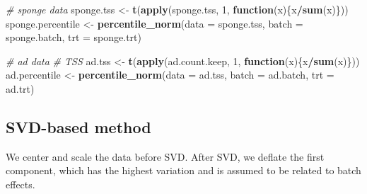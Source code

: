 \documentclass[]{book}
\newenvironment{Shaded}{\begin{snugshade}}{\end{snugshade}}
\newcommand{\KeywordTok}[1]{\textcolor[rgb]{0.13,0.29,0.53}{\textbf{#1}}}
\newcommand{\DataTypeTok}[1]{\textcolor[rgb]{0.13,0.29,0.53}{#1}}
\newcommand{\DecValTok}[1]{\textcolor[rgb]{0.00,0.00,0.81}{#1}}
\newcommand{\StringTok}[1]{\textcolor[rgb]{0.31,0.60,0.02}{#1}}
\newcommand{\CommentTok}[1]{\textcolor[rgb]{0.56,0.35,0.01}{\textit{#1}}}
\newcommand{\ControlFlowTok}[1]{\textcolor[rgb]{0.13,0.29,0.53}{\textbf{#1}}}
\newcommand{\OperatorTok}[1]{\textcolor[rgb]{0.81,0.36,0.00}{\textbf{#1}}}
\newcommand{\NormalTok}[1]{#1}
\begin{document}
\begin{Shaded}
\begin{Highlighting}[]
\CommentTok{# sponge data}
\NormalTok{sponge.tss <-}\StringTok{ }\KeywordTok{t}\NormalTok{(}\KeywordTok{apply}\NormalTok{(sponge.tss, }\DecValTok{1}\NormalTok{, }\ControlFlowTok{function}\NormalTok{(x)\{x}\OperatorTok{/}\KeywordTok{sum}\NormalTok{(x)\}))}
\NormalTok{sponge.percentile <-}\StringTok{ }\KeywordTok{percentile_norm}\NormalTok{(}\DataTypeTok{data =}\NormalTok{ sponge.tss, }\DataTypeTok{batch =}\NormalTok{ sponge.batch, }
                                    \DataTypeTok{trt =}\NormalTok{ sponge.trt)}


\CommentTok{# ad data}
\CommentTok{# TSS}
\NormalTok{ad.tss <-}\StringTok{ }\KeywordTok{t}\NormalTok{(}\KeywordTok{apply}\NormalTok{(ad.count.keep, }\DecValTok{1}\NormalTok{, }\ControlFlowTok{function}\NormalTok{(x)\{x}\OperatorTok{/}\KeywordTok{sum}\NormalTok{(x)\}))}
\NormalTok{ad.percentile <-}\StringTok{ }\KeywordTok{percentile_norm}\NormalTok{(}\DataTypeTok{data =}\NormalTok{ ad.tss, }\DataTypeTok{batch =}\NormalTok{ ad.batch, }
                                \DataTypeTok{trt =}\NormalTok{ ad.trt)}
\end{Highlighting}
\end{Shaded}

\subsection{SVD-based method}\label{svd-based-method}

We center and scale the data before SVD. After SVD, we deflate the first
component, which has the highest variation and is assumed to be related
to batch effects.
\end{document}

